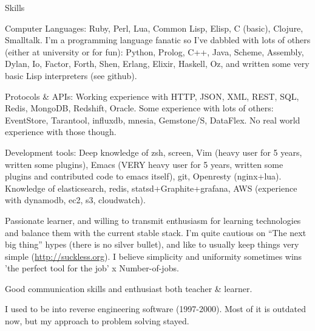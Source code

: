 \documentclass{resume} %
\begin{document}
\begin{rSection}{Skills}

\item Computer Languages: Ruby, Perl, Lua, Common Lisp, Elisp, C
  (basic), Clojure, Smalltalk.  I'm a programming language fanatic so
  I've dabbled with lots of others (either at university or for fun):
  Python, Prolog, C++, Java, Scheme, Assembly, Dylan, Io, Factor,
  Forth, Shen, Erlang, Elixir, Haskell, Oz, and written some very
  basic Lisp interpreters (see github).

\item Protocols \& APIs: Working experience with HTTP, JSON, XML,
  REST, SQL, Redis, MongoDB, Redshift, Oracle. Some experience with
  lots of others: EventStore, Tarantool, influxdb, mnesia, Gemstone/S,
  DataFlex.  No real world experience with those though.

\item Development tools: Deep knowledge of zsh, screen, Vim (heavy
  user for 5 years, written some plugins), Emacs (VERY heavy user for
  5 years, written some plugins and contributed code to emacs itself),
  git, Openresty (nginx+lua). Knowledge of elasticsearch, redis,
  statsd+Graphite+grafana, AWS (experience with dynamodb, ec2, s3,
  cloudwatch).

\item Passionate learner, and willing to transmit enthusiasm for
  learning technologies and balance them with the current stable
  stack. I'm quite cautious on ``The next big thing'' hypes (there is
  no silver bullet), and like to usually keep things very simple
  (\url{http://suckless.org}). I believe simplicity and uniformity
  sometimes wins 'the perfect tool for the job' x Number-of-jobs.

\item Good communication skills and enthusiast both teacher \& learner.

\item I used to be into reverse engineering software (1997-2000). Most
  of it is outdated now, but my approach to problem solving stayed.

\end{rSection}
\end{document}
